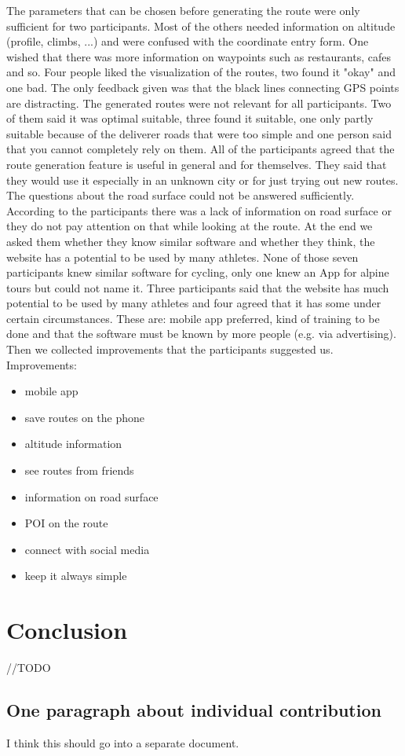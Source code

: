 \documentclass{sigchi}
\begin{document}
The parameters that can be chosen before generating the route were only sufficient for two participants. Most of the others needed information on altitude (profile, climbs, ...) and were confused with the coordinate entry form. One wished that there was more information on waypoints such as restaurants, cafes and so.
Four people liked the visualization of the routes, two found it "okay" and one bad. The only feedback given was that the black lines connecting GPS points are distracting.
The generated routes were not relevant for all participants. Two of them said it was optimal suitable, three found it suitable, one only partly suitable because of the deliverer roads that were too simple and one person said that you cannot completely rely on them.
All of the participants agreed that the route generation feature is useful in general and for themselves. They said that they would use it especially in an unknown city or for just trying out new routes.
The questions about the road surface could not be answered sufficiently. According to the participants there was a lack of information on road surface or they do not pay attention on that while looking at the route.
At the end we asked them whether they know similar software and whether they think, the website has a potential to be used by many athletes.
None of those seven participants knew similar software for cycling, only one knew an App for alpine tours but could not name it.
Three participants said that the website has much potential to be used by many athletes and four agreed that it has some under certain circumstances. These are: mobile app preferred, kind of training to be done and that the software must be known by more people (e.g. via advertising).
Then we collected improvements that the participants suggested us.
Improvements:
\begin{itemize}
\item mobile app
\item save routes on the phone
\item altitude information
\item see routes from friends
\item information on road surface
\item POI on the route
\item connect with social media
\item keep it always simple
\end{itemize}


\section{Conclusion}
//TODO

\subsection{One paragraph about individual
contribution}
I think this should go into a separate document.

\balance{}



\end{document}
